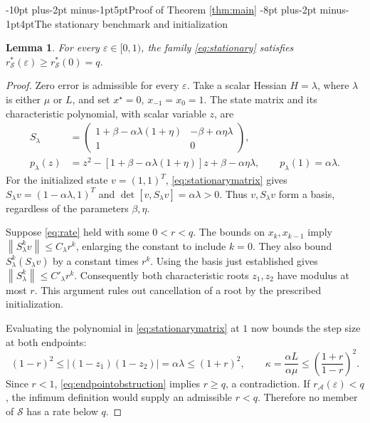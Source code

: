 \documentclass[pdflatex,sn-mathphys-num]{sn-jnl}
\makeatletter
\renewcommand\section{\@startsection{section}{1}{\z@}%
  {-10pt plus-2pt minus-1pt}{5pt}{\sectionfont}}
\renewcommand\subsection{\@startsection{subsection}{2}{\z@}%
  {-8pt plus-2pt minus-1pt}{4pt}{\subsectionfont}}
\theoremstyle{thmstyleone}
\newtheorem{lemma}{Lemma}
\theoremstyle{thmstyletwo}
\newcommand{\norm}[1]{\left\lVert #1\right\rVert}
\makeatother
\begin{document}
\section{Proof of Theorem \ref{thm:main}}\label{sec:proof}
\subsection{The stationary benchmark and initialization}
\begin{lemma}\label{lem:stationary}
For every $\varepsilon\in[0,1)$, the family
\eqref{eq:stationary} satisfies
$r_{\mathcal S}^*(\varepsilon)\geq r_{\mathcal S}^*(0)=q$.
\end{lemma}
\begin{proof}
Zero error is admissible for every $\varepsilon$. Take a scalar Hessian
$H=\lambda$, where $\lambda$ is either $\mu$ or $L$, and set
$x^\star=0$, $x_{-1}=x_0=1$. The state matrix and its characteristic
polynomial, with scalar variable $z$, are
\begin{equation}\label{eq:stationarymatrix}
\begin{split}
 S_\lambda&=
 \begin{pmatrix}
 1+\beta-\alpha\lambda(1+\eta)&-\beta+\alpha\eta\lambda\\
 1&0
 \end{pmatrix},\\
 p_\lambda(z)&=z^2-[1+\beta-\alpha\lambda(1+\eta)]z
                  +\beta-\alpha\eta\lambda,\qquad
 p_\lambda(1)=\alpha\lambda .
\end{split}
\end{equation}
For the initialized state $v=(1,1)^T$, \eqref{eq:stationarymatrix}
gives $S_\lambda v=(1-\alpha\lambda,1)^T$ and
$\det[v,S_\lambda v]=\alpha\lambda>0$. Thus $v,S_\lambda v$
form a basis, regardless of the parameters $\beta,\eta$.

Suppose \eqref{eq:rate} held with some $0<r<q$.
The bounds on $x_k,x_{k-1}$ imply
$\norm{S_\lambda^kv}\leq C_\lambda r^k$, enlarging the constant to
include $k=0$. They also bound $S_\lambda^k(S_\lambda v)$ by a
constant times $r^k$. Using the basis just established gives
$\norm{S_\lambda^k}\leq C'_\lambda r^k$. Consequently both
characteristic roots $z_1,z_2$ have modulus at most $r$.
This argument rules out cancellation of a root by the prescribed
initialization.

Evaluating the polynomial in \eqref{eq:stationarymatrix} at $1$
now bounds the step size at both endpoints:
\begin{equation}\label{eq:endpointobstruction}
 (1-r)^2\leq |(1-z_1)(1-z_2)|=\alpha\lambda\leq(1+r)^2,
 \qquad
 \kappa=\frac{\alpha L}{\alpha\mu}
       \leq\left(\frac{1+r}{1-r}\right)^2.
\end{equation}
Since $r<1$, \eqref{eq:endpointobstruction} implies $r\geq q$,
a contradiction. If $r_{\mathcal A}(\varepsilon)<q$, the infimum
definition would supply an admissible $r<q$. Therefore no member of
$\mathcal S$ has a rate below $q$.


\end{proof}
\end{document}
